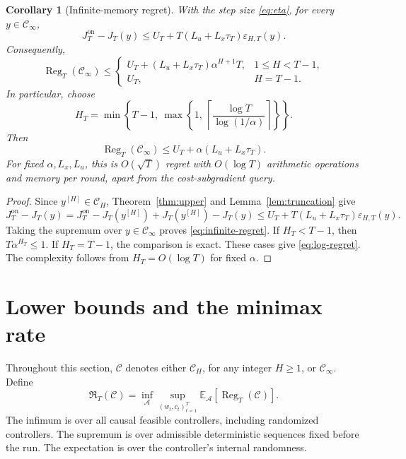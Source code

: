 \documentclass[11pt]{article}
\newtheorem{corollary}[theorem]{Corollary}
\newcommand{\E}{\mathbb E}
\newcommand{\CH}{\mathcal C_H}
\newcommand{\CI}{\mathcal C_\infty}
\newcommand{\Reg}{\operatorname{Reg}}
\begin{document}
\begin{corollary}[Infinite-memory regret]
\label{cor:infinite}
With the step size \eqref{eq:eta}, for every $y\in\CI$,
\begin{equation}
\label{eq:individual-infinite}
J_T^{\mathrm{on}}-J_T(y)
\le
U_T+T(L_u+L_x\tau_T)\varepsilon_{H,T}(y).
\end{equation}
Consequently,
\begin{equation}
\label{eq:infinite-regret}
\Reg_T(\CI)
\le
\begin{cases}
U_T+(L_u+L_x\tau_T)\alpha^{H+1}T,
&1\le H<T-1,\\
U_T,
&H=T-1.
\end{cases}
\end{equation}
In particular, choose
\begin{equation}
\label{eq:log-memory}
H_T=
\min\left\{
T-1,\
\max\left\{
1,\
\left\lceil\frac{\log T}{\log(1/\alpha)}\right\rceil
\right\}
\right\}.
\end{equation}
Then
\begin{equation}
\label{eq:log-regret}
\Reg_T(\CI)
\le U_T+\alpha(L_u+L_x\tau_T).
\end{equation}
For fixed $\alpha,L_x,L_u$, this is $O(\sqrt T)$ regret with
$O(\log T)$ arithmetic operations and memory per round,
apart from the cost-subgradient query.
\end{corollary}

\begin{proof}
Since $y^{[H]}\in\CH$, Theorem~\ref{thm:upper} and
Lemma~\ref{lem:truncation} give
\[
J_T^{\mathrm{on}}-J_T(y)
=
J_T^{\mathrm{on}}-J_T(y^{[H]})
+J_T(y^{[H]})-J_T(y)
\le
U_T+T(L_u+L_x\tau_T)\varepsilon_{H,T}(y).
\]
Taking the supremum over $y\in\CI$ proves
\eqref{eq:infinite-regret}.
If $H_T<T-1$, then $T\alpha^{H_T}\le1$.
If $H_T=T-1$, the comparison is exact.
These cases give \eqref{eq:log-regret}.
The complexity follows from $H_T=O(\log T)$ for fixed $\alpha$.
\end{proof}

\section{Lower bounds and the minimax rate}
\label{sec:lower}

Throughout this section, $\mathcal C$ denotes either $\CH$,
for any integer $H\ge1$, or $\CI$. Define
\begin{equation}
\label{eq:minimax}
\mathfrak R_T(\mathcal C)
=
\inf_{\mathcal A}
\sup_{(w_t,c_t)_{t=1}^T}
\E_{\mathcal A}[\Reg_T(\mathcal C)].
\end{equation}
The infimum is over all causal feasible controllers, including
randomized controllers. The supremum is over admissible
deterministic sequences fixed before the run. The expectation
is over the controller's internal randomness.
\end{document}
